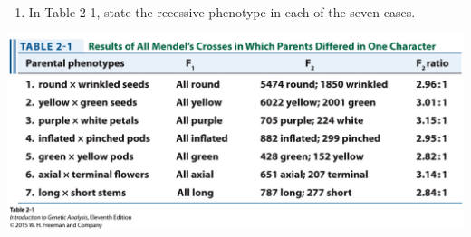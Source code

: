 \documentclass[11pt,]{article}
\providecommand{\tightlist}{%
  \setlength{\itemsep}{0pt}\setlength{\parskip}{0pt}}
\begin{document}
\begin{blackbox}

\begin{enumerate}
\def\labelenumi{\arabic{enumi}.}
\setcounter{enumi}{2}
\tightlist
\item
  In Table 2-1, state the recessive phenotype in each of the seven
  cases.
\end{enumerate}

\hfill\break

\begin{center}\includegraphics[width=0.65\linewidth,]{input/table_02_01} \end{center}

\vspace{14cm}

\end{blackbox}
\end{document}
